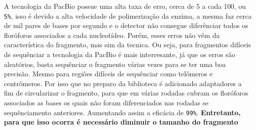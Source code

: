\documentclass[
  letterpaper,
  DIV=11,
  numbers=noendperiod]{scrartcl}
\begin{document}
A tecnologia da PacBio possue uma alta taxa de erro, cerca de 5 a cada
100, ou \texttt{5\%}, isso é devido a alta velocidade de polimerização
da enzima, a mesma faz cerca de mil pares de bases por segundo e o
detector não consegue diferênciar todos os floróforos associados a cada
nucleotídeo. Porém, esses erros não vêm da característica do fragmento,
mas sim da tecnica. Ou seja, para fragmentos difíceis de sequênciar a
tecnologia da PacBio é mais interresante, já que os erros são
aleatórios, basta sequênciar o fragmento várias vezes para se ter uma
boa precisão. Mesmo para regiôes difíceis de sequênciar como telômeros e
centrômeros. Por isso que no preparo da biblioteca é adicionado
adaptadores a fim de circularizar o fragmento, para que em várias
rodadas cubram os floróforos associados as bases os quais não foram
diferenciados nas rodadas se sequênciamento anteriores. Aumentando assim
a eficácia de \texttt{99\%}. \textbf{Entretanto, para que isso ocorra é
necessário diminuir o tamanho do fragmento}
\end{document}

